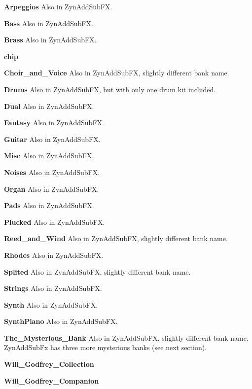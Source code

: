    \begin{enumber}
      \item \textbf{Arpeggios}
         Also in ZynAddSubFX.
      \item \textbf{Bass}
         Also in ZynAddSubFX.
      \item \textbf{Brass}
         Also in ZynAddSubFX.
      \item \textbf{chip}
      \item \textbf{Choir\_and\_Voice}
         Also in ZynAddSubFX, slightly different bank name.
      \item \textbf{Drums}
         Also in ZynAddSubFX, but with only one drum kit included.
      \item \textbf{Dual}
         Also in ZynAddSubFX.
      \item \textbf{Fantasy}
         Also in ZynAddSubFX.
      \item \textbf{Guitar}
         Also in ZynAddSubFX.
      \item \textbf{Misc}
         Also in ZynAddSubFX.
      \item \textbf{Noises}
         Also in ZynAddSubFX.
      \item \textbf{Organ}
         Also in ZynAddSubFX.
      \item \textbf{Pads}
         Also in ZynAddSubFX.
      \item \textbf{Plucked}
         Also in ZynAddSubFX.
      \item \textbf{Reed\_and\_Wind}
         Also in ZynAddSubFX, slightly different bank name.
      \item \textbf{Rhodes}
         Also in ZynAddSubFX.
      \item \textbf{Splited}
         Also in ZynAddSubFX, slightly different bank name.
      \item \textbf{Strings}
         Also in ZynAddSubFX.
      \item \textbf{Synth}
         Also in ZynAddSubFX.
      \item \textbf{SynthPiano}
         Also in ZynAddSubFX.
      \item \textbf{The\_Mysterious\_Bank}
         Also in ZynAddSubFX, slightly different bank name.
         ZynAddSubFx has three more mysterious banks (see next section).
      \item \textbf{Will\_Godfrey\_Collection}
      \item \textbf{Will\_Godfrey\_Companion}
   \end{enumber}

